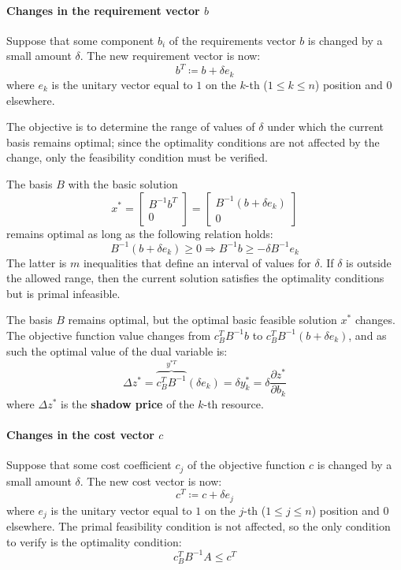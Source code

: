 \documentclass[english]{article}
\begin{document}
\paragraph[Changes in the requirement vector b]{Changes in the requirement vector \(b\)}

Suppose that some component \(b_i\) of the requirements vector \(b\) is changed by a small amount \(\delta\).
The new requirement vector is now:
\[ b^T \coloneqq b + \delta e_k \]
where \(e_k\) is the unitary vector equal to \(1\) on the \(k\)-th (\(1 \leq k \leq n\)) position and \(0\) elsewhere.

The objective is to determine the range of values of \(\delta\) under which the current basis remains optimal;
since the optimality conditions are not affected by the change, only the feasibility condition must be verified.

The basis \(B\) with the basic solution
\[ x^\ast = \begin{bmatrix} B^{-1} b^T \\ 0 \end{bmatrix} = \begin{bmatrix} B^{-1} \left( b + \delta e_k \right) \\ 0 \end{bmatrix} \]
remains optimal as long as the following relation holds:
\[ B^{-1} \left( b + \delta e_k \right) \geq 0 \Rightarrow B^{-1} b \geq - \delta B^{-1} e_k \]
The latter is \(m\) inequalities that define an interval of values for \(\delta \).
If \(\delta\) is outside the allowed range, then the current solution satisfies the optimality conditions but is primal infeasible.

The basis \(B\) remains optimal, but the optimal basic feasible solution \(x^\ast\) changes.
The objective function value changes from \(c_B^T B^{-1} b\) to \(c_B^T B^{-1} \left( b + \delta e_k \right)\), and as such the optimal value of the dual variable is:
\[ \Delta z^\ast = \overbrace{c_B^T B^{-1}}^{y^{\ast T}} \left( \delta e_k \right) = \delta  y_k^\ast = \delta  \dfrac{\partial z^\ast}{\partial b_k}\]
where \(\Delta z^\ast\) is the \textbf{shadow price} of the \(k\)-th resource.

\paragraph[Changes in the cost vector c]{Changes in the cost vector \(c\)}

Suppose that some cost coefficient \(c_j\) of the objective function \(c\) is changed by a small amount \(\delta\).
The new cost vector is now:
\[ c^T \coloneqq c + \delta  e_j \]
where \(e_j\) is the unitary vector equal to \(1\) on the \(j\)-th (\(1 \leq j \leq n\)) position and \(0\) elsewhere.
The primal feasibility condition is not affected, so the only condition to verify is the optimality condition:
\[ c^T_B B^{-1} A \leq c^T \]
\end{document}
